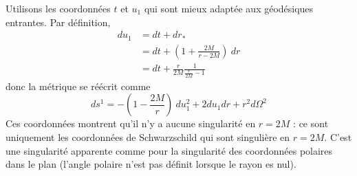 \documentclass[a4paper,11pt]{report}
\begin{document}
            Utilisons les coordonnées $t$ et $u_1$ qui sont mieux adaptée aux géodésiques entrantes. Par définition, 
            \begin{align}
                du_1 &= dt+dr_*\\
                &= dt + \left( 1+\frac{2M}{r-2M} \right)~dr\\
                &= dt +\frac{r}{2M}\frac{1}{\frac{r}{2M}-1}
            \end{align}
            donc la métrique se réécrit comme
            \begin{equation}
                ds^1 = -\left( 1-\frac{2M}{r} \right)~du^2_1 + 2du_1dr+r^2d\Omega^2
            \end{equation}
            Ces coordonnées montrent qu'il n'y a aucune singularité en $r=2M$ : ce sont uniquement les coordonnées de Schwarzschild qui sont singulière en $r=2M$. C'est une singularité apparente comme pour la singularité des coordonnées polaires dans le plan (l'angle polaire n'est pas définit lorsque le rayon es nul).\\
            
            
\end{document}
